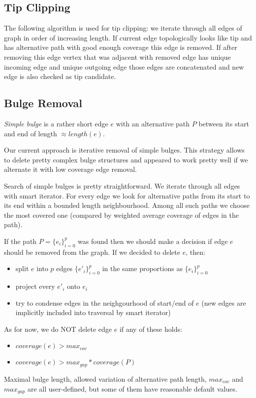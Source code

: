\documentclass[12pt]{article}
\begin{document}
\subsection{Tip Clipping}

The following algorithm is used for tip clipping: we iterate through all edges of graph in order of increasing length. If current edge topologically looks like tip and has alternative path with good enough coverage this edge is removed. If after removing this edge vertex that was adjacent with removed edge has unique incoming edge and unique outgoing edge those edges are concatenated and new edge is also checked as tip candidate.

\subsection{Bulge Removal}
\textit{Simple bulge} is a rather short edge $e$ with an alternative path $P$ between its start and end of length $\approx length(e)$.

Our current approach is iterative removal of simple bulges. This strategy allows to delete pretty complex bulge structures and appeared to work pretty well if we alternate it with low coverage edge removal.

Search of simple bulges is pretty straightforward.
We iterate through all edges with smart iterator. For every edge we look for alternative paths from its start to its end within a bounded length neighbourhood.
Among all such paths we choose the most covered one (compared by weighted average coverage of edges in the path).  

If the path $P=\{e_i\}_{i=0}^{p}$ was found then we should make a decision if edge $e$ should be removed from the graph. If we decided to delete $e$, then:
\begin{itemize}
\item split $e$ into $p$ edges $\{e'_i\}_{i=0}^{p}$ in the same proportions as $\{e_i\}_{i=0}^{p}$
\item project every $e'_i$ onto $e_i$
\item try to condense edges in the neighgourhood of start/end of $e$ (new edges are implicitly included into traversal by smart iterator)
\end{itemize}

As for now, we do NOT delete edge $e$ if any of these holds:
\begin{itemize}
\item $coverage(e)>max_{cov}$
\item $coverage(e)>max_{gap}*coverage(P)$
\end{itemize}

Maximal bulge length, allowed variation of alternative path length, $max_{cov}$ and $max_{gap}$ are all user-defined, but some of them have reasonable default values.
\end{document}
